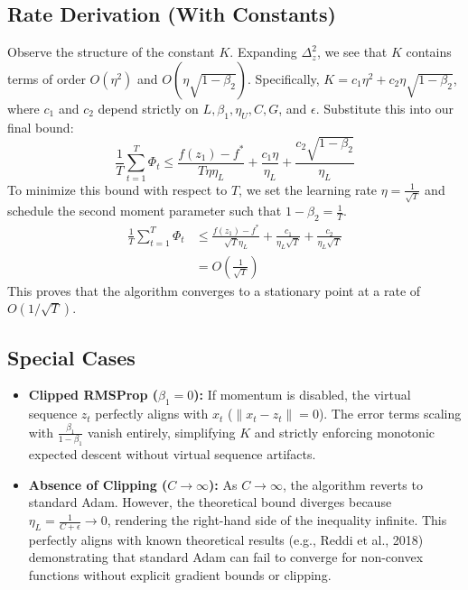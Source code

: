 \documentclass{article}
\begin{document}
\subsection*{Rate Derivation (With Constants)}
Observe the structure of the constant $K$. Expanding $\Delta_z^2$, we see that $K$ contains terms of order $O(\eta^2)$ and $O(\eta \sqrt{1-\beta_2})$. 
Specifically, $K = c_1 \eta^2 + c_2 \eta \sqrt{1-\beta_2}$, where $c_1$ and $c_2$ depend strictly on $L, \beta_1, \eta_U, C, G$, and $\epsilon$.
Substitute this into our final bound:
\begin{equation}
    \frac{1}{T} \sum_{t=1}^T \Phi_t \leq \frac{f(z_1) - f^*}{T \eta \eta_L} + \frac{c_1 \eta}{\eta_L} + \frac{c_2 \sqrt{1-\beta_2}}{\eta_L}
\end{equation}
To minimize this bound with respect to $T$, we set the learning rate $\eta = \frac{1}{\sqrt{T}}$ and schedule the second moment parameter such that $1-\beta_2 = \frac{1}{T}$.
\begin{align}
    \frac{1}{T} \sum_{t=1}^T \Phi_t &\leq \frac{f(z_1) - f^*}{\sqrt{T} \eta_L} + \frac{c_1}{\eta_L \sqrt{T}} + \frac{c_2}{\eta_L \sqrt{T}} \nonumber \\
    &= O\left(\frac{1}{\sqrt{T}}\right)
\end{align}
This proves that the algorithm converges to a stationary point at a rate of $O(1/\sqrt{T})$.

\subsection*{Special Cases}
\begin{itemize}
    \item \textbf{Clipped RMSProp ($\beta_1 = 0$):} If momentum is disabled, the virtual sequence $z_t$ perfectly aligns with $x_t$ ($\|x_t - z_t\| = 0$). The error terms scaling with $\frac{\beta_1}{1-\beta_1}$ vanish entirely, simplifying $K$ and strictly enforcing monotonic expected descent without virtual sequence artifacts.
    \item \textbf{Absence of Clipping ($C \to \infty$):} As $C \to \infty$, the algorithm reverts to standard Adam. However, the theoretical bound diverges because $\eta_L = \frac{1}{C+\epsilon} \to 0$, rendering the right-hand side of the inequality infinite. This perfectly aligns with known theoretical results (e.g., Reddi et al., 2018) demonstrating that standard Adam can fail to converge for non-convex functions without explicit gradient bounds or clipping.
\end{itemize}
\end{document}
